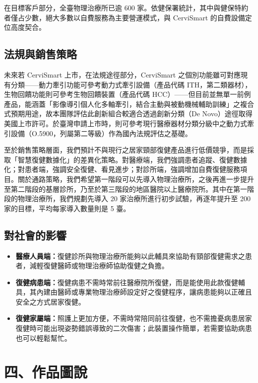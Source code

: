 \documentclass[12pt,a4paper]{article}
\begin{document}
在目標客戶部分，全臺物理治療所已逾 600 家。依健保署統計，其中與健保特約者僅占少數\cite{nhi2026}，絕大多數以自費服務為主要營運模式，與 CerviSmart 的自費設備定位高度契合。

\subsection{法規與銷售策略}

未來若 CerviSmart 上市，在法規途徑部分，CerviSmart 之個別功能雖可對應現有分類——動力牽引功能可參考動力式牽引設備（產品代碼 ITH，第二類器材）\cite{fda-ith}，生物回饋功能則可參考生物回饋裝置（產品代碼 HCC）\cite{fda-hcc}——但目前並無單一前例產品，能涵蓋「影像導引個人化多軸牽引，結合主動與被動機械輔助訓練」之複合式預期用途，故本團隊評估此創新組合較適合透過創新分類（De Novo）途徑取得美國上市許可\cite{fda-denovo}。於臺灣申請上市時，則可參考現行醫療器材分類分級中之動力式牽引設備（O.5900，列屬第二等級）作為國內法規評估之基礎\cite{tfda-o5900}。

至於銷售策略層面，我們預計不與現行之居家頸部復健產品進行低價競爭，而是採取「智慧復健數據化」的差異化策略。對醫療端，我們強調患者追蹤、復健數據化；對患者端，強調安全復健、看見進步；對診所端，強調增加自費復健服務項目。關於通路策略，我們希望第一階段可以先導入物理治療所，之後再進一步提升至第二階段的基層診所，乃至於第三階段的地區醫院以上醫療院所。其中在第一階段的物理治療所，我們規劃先導入 20 家治療所進行初步試驗，再逐年提升至 200 家的目標，平均每家導入數量則是 5 臺。

\subsection{對社會的影響}

\begin{itemize}
    \item \textbf{醫療人員端：}復健診所與物理治療所能夠以此輔具來協助有頸部復健需求之患者，減輕復健醫師或物理治療師協助復健之負擔。
    \item \textbf{復健病患端：}復健病患不需時常前往醫療院所復健，而是能使用此款復健輔具，其內建由醫師或專業物理治療師設定好之復健程序，讓病患能夠以正確且安全之方式居家復健。
    \item \textbf{復健家屬端：}照護上更加方便，不需時常陪同前往復健，也不需擔憂病患居家復健時可能出現姿勢錯誤導致的二次傷害；此裝置操作簡單，若需要協助病患也可以輕鬆幫忙。
\end{itemize}

\section{四、作品圖說}
\end{document}
